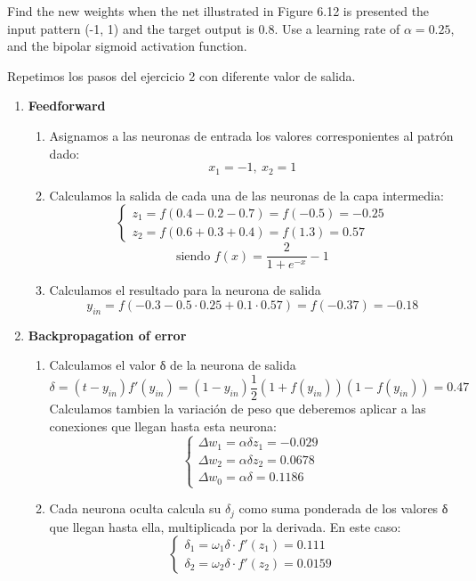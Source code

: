 \begin{problem}[4]
Find the new weights when the net illustrated in Figure 6.12 is presented the input pattern (-1, 1) and the target output is 0.8. Use a learning rate of $α = 0.25$, and the bipolar sigmoid activation function.

\solution

Repetimos los pasos del ejercicio 2 con diferente valor de salida.

\begin{enumerate}
\item \textbf{Feedforward}
\begin{enumerate}
\item Asignamos a las neuronas de entrada los valores corresponientes al patrón dado:
\[x_1 = -1, \ x_2 = 1\]
\item Calculamos la salida de cada una de las neuronas de la capa intermedia:
\[\left\{ \begin{array}{l}
z_1 = f(0.4 -0.2-0.7) = f(-0.5) = -0.25\\
z_2 = f(0.6+0.3+0.4) =f(1.3) = 0.57
\end{array}\right.\]
\[\text{siendo }f(x) = \frac{2}{1+e^{-x}} -1 \]

\item Calculamos el resultado para la neurona de salida
\[y_{in} = f(-0.3-0.5\cdot 0.25 + 0.1 \cdot 0.57)=f(-0.37) = -0.18\]
\end{enumerate}
\item \textbf{Backpropagation of error}
\begin{enumerate}
\item Calculamos el valor δ de la neurona de salida
\[δ = (t-y_{in})f'(y_{in}) = (1-y_{in})\frac{1}{2}(1+f(y_{in}))(1-f(y_{in})) = 0.47\]
Calculamos tambien la variación de peso que deberemos aplicar a las conexiones que llegan hasta esta neurona:
\[\left\{ \begin{array}{l}
Δw_1= αδz_1 = -0.029 \\
Δw_2= αδz_2 = 0.0678 \\
Δw_0= αδ = 0.1186
\end{array}\right.\]

\item Cada neurona oculta calcula su $δ_j$ como suma ponderada de los valores δ que llegan hasta ella, multiplicada por la derivada. En este caso:
\[\left\{ \begin{array}{l}
δ_1= ω_1 δ \cdot f'(z_1)= 0.111\\
δ_2= ω_2 δ \cdot f'(z_2)= 0.0159
\end{array}\right.\]


\end{enumerate}
\end{enumerate}
\end{problem}
